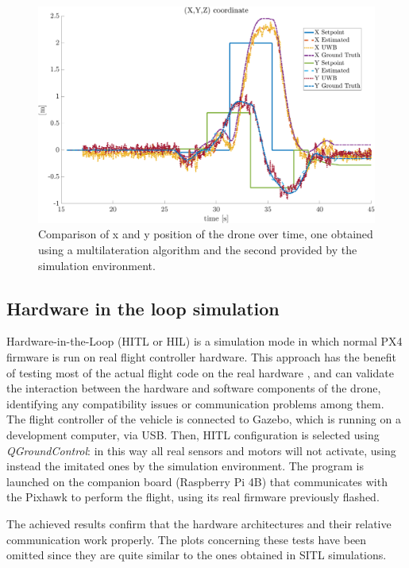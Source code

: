 \documentclass[journal]{IEEEtran}
\begin{document}
\begin{figure}
    \centering
    \includegraphics[scale=0.2]{Images/SITL_UWB/xy_sitl_uwb_un_time.png}
    \caption{Comparison of x and y position of the drone over time, one obtained using a multilateration algorithm and the second provided by the simulation environment.}
    \label{fig:uwb_sim}
\end{figure}


\subsection{Hardware in the loop simulation}

Hardware-in-the-Loop (HITL or HIL) is a simulation mode in which normal PX4 firmware is run on real flight controller hardware. This approach has the benefit of testing most of the actual flight code on the real hardware \cite{hitl}, and can validate the interaction between the hardware and software components of the drone, identifying any compatibility issues or communication problems among them. The flight controller of the vehicle is connected to Gazebo, which is running on a development computer, via USB. Then, HITL configuration is selected using \textit{QGroundControl}: in this way all real sensors and motors will not activate, using instead the imitated ones by the simulation environment. The program is launched on the companion board (Raspberry Pi 4B) that communicates with the Pixhawk to perform the flight, using its real firmware previously flashed. 

The achieved results confirm that the hardware architectures and their relative communication work properly. The plots concerning these tests have been omitted since they are quite similar to the ones obtained in SITL simulations.
\end{document}
